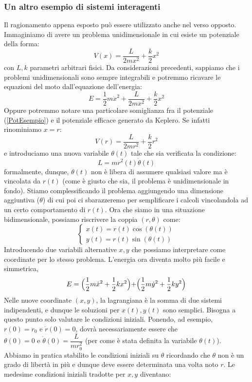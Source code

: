 \documentclass[a4paper,openany]{article}
\begin{document}
	\subsubsection{Un altro esempio di sistemi interagenti}
	Il ragionamento appena esposto può essere utilizzato anche nel verso opposto. Immaginiamo di avere un problema unidimensionale in cui esiste un potenziale della forma:
	\begin{equation}
		V(x) = \dfrac{L}{2mx^{2}} + \dfrac{k}{2}x^{2}
		\label{PotEsempio}
	\end{equation}
	con $L,k$ parametri arbitrari fisici. Da considerazioni precedenti, sappiamo che i problemi unidimensionali sono sempre integrabili e potremmo ricavare le equazioni del moto dall'equazione dell'energia:
	$$
	E = \dfrac{1}{2}m\dot{x}^{2} + \dfrac{L}{2mx^{2}} + \dfrac{k}{2}x^{2}
	$$
	Oppure potremmo notare una particolare somiglianza fra il potenziale (\ref{PotEsempio}) e il potenziale efficace generato da Keplero. Se infatti rinominiamo $x=r$:
	$$
	V(r) = \dfrac{L}{2mr^{2}} + \dfrac{k}{2}r^{2}
	$$
	e introduciamo una nuova variabile $\theta(t)$ tale che sia verificata la condizione:
	$$
	L = mr^{2}(t)\dot{\theta}(t)
	$$
	formalmente, dunque, $\theta(t)$ non è libera di assumere qualsiasi valore ma è vincolata da $r(t)$ (come è giusto che sia, il problema è unidimensionale in fondo). Stiamo complessificando il problema aggiungendo una dimensione aggiuntiva ($\theta$) di cui poi ci sbarazzeremo per semplificare i calcoli vincolandola ad un certo comportamento di $r(t)$. Ora che siamo in una situazione bidimensionale, possiamo riscrivere la coppia $(r,\theta)$ come:
	\begin{equation}
		\begin{cases}
			x(t) = r(t)\cos(\theta(t)) \\
			y(t) = r(t)\sin(\theta(t))
		\end{cases}
	\end{equation}
	Introducendo due variabili alternative $x,y$ che possiamo interpretare come coordinate per lo stesso problema. L'energia ora diventa molto più facile e simmetrica,
	$$
	E = \Bigl(\dfrac{1}{2}m\dot{x}^{2} + \dfrac{1}{2}kx^{2}\Bigl) + \Bigl(\dfrac{1}{2}m\dot{y}^{2} + \dfrac{1}{2}ky^{2}\Bigl)
	$$
	Nelle nuove coordinate $(x,y)$, la lagrangiana è la somma di due sistemi indipendenti, e dunque le soluzioni per $x(t), y(t)$ sono semplici. Bisogna a questo punto solo valutare le condizioni iniziali. Ponendo, ad esempio, $r(0) = r_{0} \mbox{ e } \dot{r}(0) = 0$, dovrà necessariamente essere che $\theta(0)=0 \mbox{ e } \dot{\theta}(0) = \dfrac{L}{mr_{0}^{2}}$ (per come è stata definita la variabile $\theta(t)$). Abbiamo in pratica stabilito le condizioni iniziali su $\theta$ ricordando che $\theta$ non è un grado di libertà in più e dunque deve essere determinata una volta noto $r$. Le medesime condizioni iniziali tradotte per $x,y$ diventano:
\end{document}
